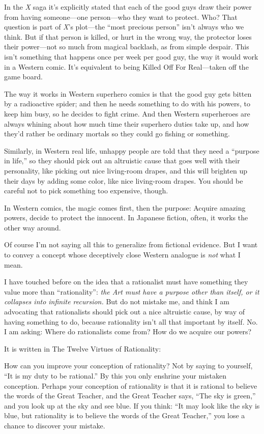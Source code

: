 {
 In the \textit{X} saga it's explicitly stated that
each of the good guys draw their power from having someone---one
person---who they want to protect. Who? That question is part of
\textit{X}'s plot---the ``most
precious person'' isn't always who we
think. But if that person is killed, or hurt in the wrong way, the
protector loses their power---not so much from magical backlash, as
from simple despair. This isn't something that happens
once per week per good guy, the way it would work in a Western comic.
It's equivalent to being Killed Off For Real{}---taken
off the game board.}

{
 The way it works in Western superhero comics is that the good guy
gets bitten by a radioactive spider; and then he needs something to do
with his powers, to keep him busy, so he decides to fight crime. And
then Western superheroes are always whining about how much time their
superhero duties take up, and how they'd rather be
ordinary mortals so they could go fishing or something.}

{
 Similarly, in Western real life, unhappy people are told that they
need a ``purpose in life,'' so they
should pick out an altruistic cause that goes well with their
personality, like picking out nice living-room drapes, and this will
brighten up their days by adding some color, like nice living-room
drapes. You should be careful not to pick something too expensive,
though.}

{
 In Western comics, the magic comes first, then the purpose:
Acquire amazing powers, decide to protect the innocent. In Japanese
fiction, often, it works the other way around.}

{
 Of course I'm not saying all this to generalize
from fictional evidence. But I want to convey a concept whose
deceptively close Western analogue is \textit{not} what I mean.}

{
 I have touched before on the idea that a rationalist must have
something they value more than
``rationality'': \textit{the Art
must have a purpose other than itself, or it collapses into infinite
recursion.} But do not mistake me, and think I am advocating that
rationalists should pick out a nice altruistic cause, by way of having
something to do, because rationality isn't all that
important by itself. No. I am asking: Where do rationalists come from?
How do we acquire our powers?}

{
 It is written in The Twelve Virtues of Rationality:}

{
 How can you improve your conception of rationality? Not by saying
to yourself, ``It is my duty to be
rational.'' By this you only enshrine your mistaken
conception. Perhaps your conception of rationality is that it is
rational to believe the words of the Great Teacher, and the Great
Teacher says, ``The sky is green,''
and you look up at the sky and see blue. If you think:
``It may look like the sky is blue, but rationality is
to believe the words of the Great Teacher,'' you lose
a chance to discover your mistake.}

